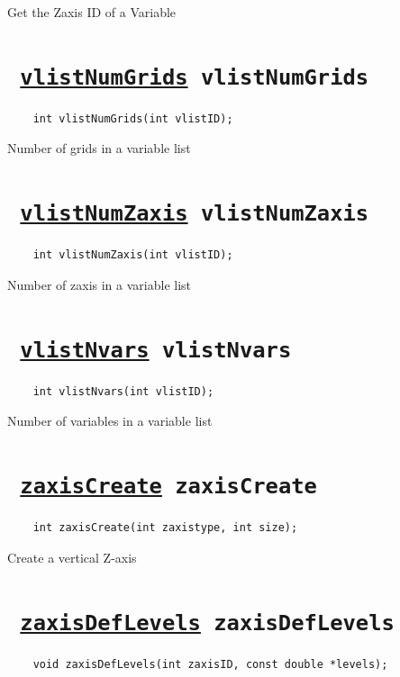 Get the Zaxis ID of a Variable
\ifpdfoutput{}{(\ref{vlistInqVarZaxis})}


\section*{\texttt{ 
\ifpdf
\hyperref[vlistNumGrids]{vlistNumGrids}
\else
vlistNumGrids
\fi
}}
\begin{verbatim}
    int vlistNumGrids(int vlistID);
\end{verbatim}

Number of grids in a variable list
\ifpdfoutput{}{(\ref{vlistNumGrids})}


\section*{\texttt{ 
\ifpdf
\hyperref[vlistNumZaxis]{vlistNumZaxis}
\else
vlistNumZaxis
\fi
}}
\begin{verbatim}
    int vlistNumZaxis(int vlistID);
\end{verbatim}

Number of zaxis in a variable list
\ifpdfoutput{}{(\ref{vlistNumZaxis})}


\section*{\texttt{ 
\ifpdf
\hyperref[vlistNvars]{vlistNvars}
\else
vlistNvars
\fi
}}
\begin{verbatim}
    int vlistNvars(int vlistID);
\end{verbatim}

Number of variables in a variable list
\ifpdfoutput{}{(\ref{vlistNvars})}


\section*{\texttt{ 
\ifpdf
\hyperref[zaxisCreate]{zaxisCreate}
\else
zaxisCreate
\fi
}}
\begin{verbatim}
    int zaxisCreate(int zaxistype, int size);
\end{verbatim}

Create a vertical Z-axis
\ifpdfoutput{}{(\ref{zaxisCreate})}


\section*{\texttt{ 
\ifpdf
\hyperref[zaxisDefLevels]{zaxisDefLevels}
\else
zaxisDefLevels
\fi
}}
\begin{verbatim}
    void zaxisDefLevels(int zaxisID, const double *levels);
\end{verbatim}

